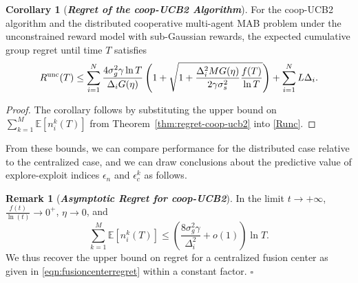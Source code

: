 \documentclass[final,5p,times,twocolumn]{elsarticle}
\theoremstyle{definition}
\newtheorem{corollary}{Corollary}
\newtheorem{remark}{Remark}
\def\expt{\mathbb{E}}
\newcommand{\supscr}[2]{#1^{\textup{#2}}}
\newcommand\oprocendsymbol{\hbox{$\square$}}
\newcommand\oprocend{\relax\ifmmode\else\unskip\hfill\fi\oprocendsymbol}
\newcommand\bit[1]{\textit{\textbf{#1}}}
\begin{document}
\begin{corollary}[\bit{Regret of the coop-UCB2 Algorithm}]\label{corr:regret-coop-ucb2}
For the coop-UCB2 algorithm and the distributed cooperative multi-agent MAB problem under the unconstrained reward model with sub-Gaussian rewards, the expected cumulative group regret until time $T$ satisfies
\[
\supscr{R}{unc}(T)	\leq \sum_{i=1}^N \frac{4 \sigma_g^2 \gamma \ln T}{\Delta_i G(\eta)} \left( 1 + \sqrt{1 + \frac{\Delta_i^2 M G(\eta)}{2\gamma \sigma_s^2} \frac{f(T)}{\ln T}} \right) + \sum_{i=1}^N L \Delta_i.
\]
\end{corollary}
\begin{proof}
    The corollary follows by substituting the upper bound on $\sum_{k=1}^M \expt[n_i^k(T)]$ from Theorem~\ref{thm:regret-coop-ucb2} into  \eqref{Runc}. 
\end{proof}

From these bounds, we can compare performance for the distributed case relative to the centralized case,  %
and we can draw conclusions about the predictive value of explore-exploit indices $\epsilon_n$ and $\epsilon_c^k$ as follows. 

\begin{remark}[\bit{Asymptotic Regret for coop-UCB2}]
	In the limit $t\rightarrow + \infty$, $\frac{f(t)}{\ln(t)} \to 0^+$, $\eta \rightarrow 0$, and   %
	\begin{equation*}
	\sum_{k=1}^M \mathbb{E}[n_i^k(T)] \leq  \left( \frac{8 \sigma_g^2  \gamma}{\Delta_i^2} + o(1) \right)\ln T.   
	\end{equation*}
	We thus recover the upper bound on regret for a {centralized fusion center} %
	as given in \eqref{eqn:fusioncenterregret} within a constant factor.
	\oprocend
\end{remark}
\end{document}

